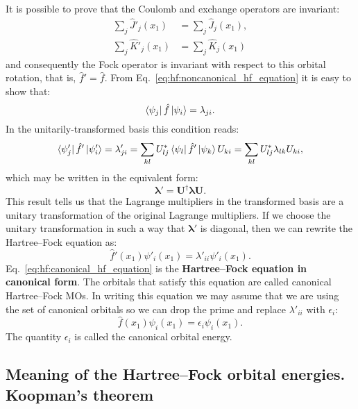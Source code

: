 \documentclass[../Main/chem532-notes.tex]{subfiles}
\begin{document}
It is possible to prove that the Coulomb and exchange operators are invariant:
\begin{align}
\sum_j \hat{J}'_j(x_1) &= \sum_j \hat{J}_j(x_1), \\
\sum_j \hat{K}'_j(x_1) &= \sum_j \hat{K}_j(x_1)
\end{align}
and consequently the Fock operator is invariant with respect to this orbital rotation, that is, $\hat{f}' = \hat{f}$. 
From Eq.~\eqref{eq:hf:noncanonical_hf_equation} it is easy to show that:
\begin{equation}
\bra{\psi_j} \hat{f} \ket{\psi_i} = \lambda_{ji}.
\end{equation}
In the unitarily-transformed basis this condition reads:
\begin{equation}
\bra{\psi'_j} \hat{f}' \ket{\psi'_i} = \lambda'_{ji} = \sum_{kl} U_{lj}^* \bra{\psi_l} \hat{f}' \ket{\psi_k} U_{ki}
= \sum_{kl} U_{lj}^* \lambda_{lk} U_{ki},
\end{equation}
which may be written in the equivalent form:
\begin{equation}
\boldsymbol\lambda' = \mathbf{U}^{\dagger} \boldsymbol\lambda \mathbf{U}.
\end{equation}
This result tells us that the Lagrange multipliers in the transformed basis are a unitary transformation of the original Lagrange multipliers.
If we choose the unitary transformation in such a way that $\boldsymbol\lambda'$ is diagonal, then we can rewrite the Hartree--Fock equation as:
 \begin{equation} \label{eq:hf:canonical_hf_equation}
\hat{f}'(x_1)  \psi'_{i}(x_1) 
= \lambda'_{ii} \psi'_{i}(x_1).
\end{equation}
Eq.~\eqref{eq:hf:canonical_hf_equation} is the \textbf{Hartree--Fock equation in canonical form}.
The orbitals that satisfy this equation are called canonical Hartree--Fock MOs.
In writing this equation we may assume that we are using the set of canonical orbitals so we can drop the prime and replace $\lambda'_{ii}$ with $\epsilon_{i}$:
\begin{equation} \label{eq:hf:canonical_hf_equation}
\hat{f}(x_1)  \psi_{i}(x_1) 
= \epsilon_{i} \psi_{i}(x_1).
\end{equation}
The quantity $\epsilon_{i}$ is called the canonical orbital energy.

\subsection{Meaning of the Hartree--Fock orbital energies. Koopman's theorem}
\end{document}
